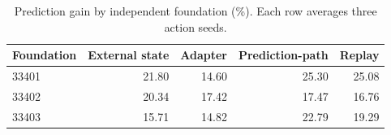 \begin{table}[tbp]
\centering\small
\caption{Prediction gain by independent foundation (\%). Each row averages three action seeds.}
\label{tab:foundations}
\begin{tabular}{@{}lrrrr@{}}
\toprule
Foundation & External state & Adapter & Prediction-path & Replay \\
\midrule
33401 & 21.80 & 14.60 & 25.30 & 25.08 \\
33402 & 20.34 & 17.42 & 17.47 & 16.76 \\
33403 & 15.71 & 14.82 & 22.79 & 19.29 \\
\bottomrule
\end{tabular}
\end{table}
